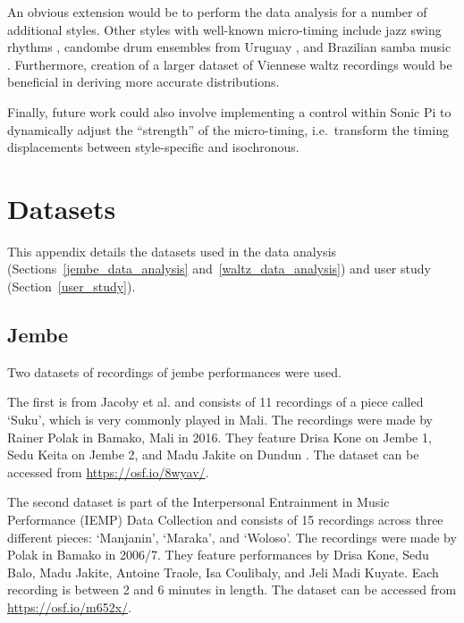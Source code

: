 \documentclass[12pt,twoside,openright]{report}
\begin{document}
An obvious extension would be to perform the data analysis for a number of
additional styles. Other styles with well-known micro-timing include jazz swing
rhythms \cite{dittmar2018}, candombe drum ensembles from Uruguay \cite{jure2016,fuentes2019}, and Brazilian samba music \cite{naveda2011,fuentes2019}. Furthermore,
creation of a larger dataset of Viennese waltz recordings would be beneficial in
deriving more accurate distributions.

Finally, future work could also involve implementing a control within Sonic Pi
to dynamically adjust the ``strength'' of the micro-timing, i.e.\ transform the
timing displacements between style-specific and isochronous.





\printbibliography[heading=bibintoc]





\appendix





\chapter{Datasets} \label{appendix_datasets}

This appendix details the datasets used in the data analysis (Sections~\ref{jembe_data_analysis} and~\ref{waltz_data_analysis}) and user study (Section~\ref{user_study}).



\section*{Jembe} \label{appendix_datasets_jembe}

Two datasets of recordings of jembe performances were used.

The first is from Jacoby et al. \cite{jacoby2021} and consists of 11 recordings of a piece called `Suku', which is very commonly played in Mali. The recordings were made by Rainer Polak in Bamako, Mali in 2016. They feature Drisa Kone on Jembe 1, Sedu Keita on Jembe 2, and Madu Jakite on Dundun \cite{jacoby2021supp}. The dataset can be accessed from \url{https://osf.io/8wyav/}.

The second dataset is part of the Interpersonal Entrainment in Music Performance (IEMP)
Data Collection \cite{polak2020,clayton2021} and consists of 15 recordings across three different pieces: `Manjanin', `Maraka', and `Woloso'. The recordings were made by Polak in Bamako in 2006/7. They feature performances by Drisa Kone, Sedu Balo, Madu Jakite, Antoine Traole, Isa Coulibaly, and Jeli Madi Kuyate. Each recording is between 2 and 6 minutes in length. The dataset can be accessed from \url{https://osf.io/m652x/}.
\end{document}
